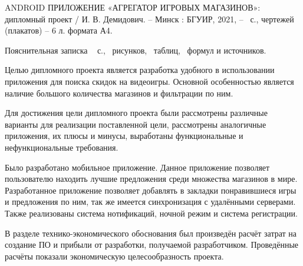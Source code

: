 \thispagestyle{empty}

ANDROID ПРИЛОЖЕНИЕ «АГРЕГАТОР ИГРОВЫХ МАГАЗИНОВ»: дипломный проект / И. В. Демидович. – Минск : БГУИР, 2021, –~\pageref*{LastPage} с., чертежей (плакатов) – 6 л. формата А4.

Пояснительная записка ~\pageref*{LastPage} с., \totfig{}~рисунков, \tottab{}~таблиц, \toteq{}~формул и \totref{} источников.

Целью дипломного проекта является разработка удобного в использовании приложения для поиска скидок на видеоигры.
Основной особенностью является наличие большого количества магазинов и фильтрации по ним.

Для достижения цели дипломного проекта были рассмотрены различные варианты для реализации поставленной цели, рассмотрены аналогичные приложения, их плюсы и минусы, выработаны функциональные и нефункциональные требования.

Было разработано мобильное приложение. 
Данное приложение позволяет пользователю находить лучшие предложения среди множества магазинов в мире.
Разработанное приложение позволяет добавлять в закладки понравившиеся игры и предложения по ним, так же имеется синхронизация с удалёнными серверами.
Также реализованы система нотификаций, ночной режим и система регистрации.

В разделе технико-экономического обоснования был произведён расчёт затрат на создание ПО и прибыли от разработки, получаемой разработчиком. Проведённые расчёты показали экономическую целесообразность проекта.
\clearpage
